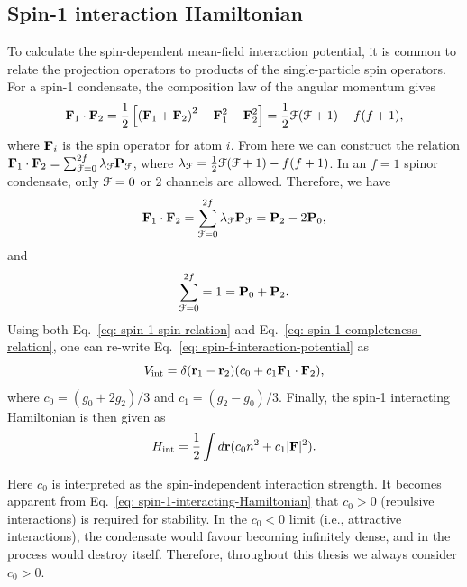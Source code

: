 \subsection{Spin-1 interaction Hamiltonian}\label{subsec: spin-1-int-hamil}
To calculate the spin-dependent mean-field interaction potential, it is common
to relate the projection operators to products of the single-particle spin
operators.
For a spin-1 condensate, the composition law of the angular momentum
gives~\cite{Kawaguchi2012, StamperKurn2013}
\begin{equation}\label{eq: composition-law}
    \vb{F}_1 \cdot \vb{F}_2 = \frac{1}{2}\left[{(\vb{F}_1 + \vb{F}_2)}^2
        - \vb{F}_1^2 - \vb{F}_2^2\right] = \frac{1}{2}\EuScript{F}(\EuScript{F} + 1)
    -f(f+1),
\end{equation}
where \(\vb{F}_i\) is the spin operator for atom \(i\).
From here we can construct the relation \(\vb{F}_1 \cdot \vb{F}_2 =
\sum_{\EuScript{F} = 0}^{2f}\lambda_\EuScript{F}\vb{P}_\EuScript{F}\), where
\(\lambda_\EuScript{F} = \frac{1}{2}\EuScript{F}(\EuScript{F} + 1)
-f(f+1)\).
In an \(f=1\) spinor condensate, only \(\EuScript{F} = 0\) or \(2\) channels
are allowed.
Therefore, we have
\begin{equation}\label{eq: spin-1-spin-relation}
    \vb{F}_1 \cdot \vb{F}_2 = \sum_{\EuScript{F} = 0}^{2f}
    \lambda_\EuScript{F}\vb{P}_\EuScript{F} = \vb{P}_2 - 2\vb{P}_0,
\end{equation}
and
\begin{equation}\label{eq: spin-1-completeness-relation}
    \sum_{\EuScript{F} = 0}^{2f} = 1 = \vb{P}_0 + \vb{P}_2.
\end{equation}
Using both Eq.~\eqref{eq: spin-1-spin-relation} and
Eq.~\eqref{eq: spin-1-completeness-relation}, one can re-write
Eq.~\eqref{eq: spin-f-interaction-potential} as
\begin{equation}
    V_\mathrm{int} = \delta(\vb{r}_1 - \vb{r}_2)
    (c_0 + c_1 \vb{F}_1 \cdot \vb{F}_2),
\end{equation}
where \(c_0 = (g_0+2g_2)/3\) and \(c_1=(g_2-g_0) / 3\).
Finally, the spin-1 interacting Hamiltonian is then given as
\begin{equation}\label{eq: spin-1-interacting-Hamiltonian}
    H_\mathrm{int} = \frac{1}{2}\int d\vb{r} (c_0n^2 + c_1|\vb{F}|^2).
\end{equation}

Here \(c_0\) is interpreted as the spin-independent interaction strength.
It becomes apparent from Eq.~\ref{eq: spin-1-interacting-Hamiltonian} that
\(c_0 > 0\) (repulsive interactions) is required for stability.
In the \(c_0 < 0\) limit (i.e., attractive interactions), the condensate would
favour becoming infinitely dense, and in the process would destroy itself.
Therefore, throughout this thesis we always consider \(c_0 > 0\).

